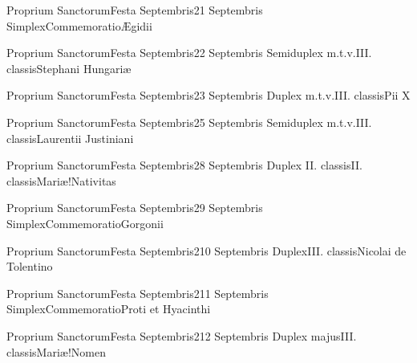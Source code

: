 \documentclass[liber-responsorialis_aestivus.tex]{subfiles}
\begin{document}

	{Proprium Sanctorum}{Festa Septembris}{2}{1 Septembris}
	{Simplex}{Commemoratio}{Ægidii}
	{}
	{}
\rubric{\respdetemp}

	{Proprium Sanctorum}{Festa Septembris}{2}{2 Septembris}
	{Semiduplex m.t.v.}{III. classis}{Stephani Hungariæ}
	{\conprubric}
	{\respdetemp}

	{Proprium Sanctorum}{Festa Septembris}{2}{3 Septembris}
	{Duplex m.t.v.}{III. classis}{Pii X}
	{\coporubric}
	{\respdetemp}

	{Proprium Sanctorum}{Festa Septembris}{2}{5 Septembris}
	{Semiduplex m.t.v.}{III. classis}{Laurentii Justiniani}
	{\coporubric}
	{\respdetemp}

	{Proprium Sanctorum}{Festa Septembris}{2}{8 Septembris}
	{Duplex II. classis}{II. classis}{Mariæ!Nativitas}
	{}
	{}
 

	{Proprium Sanctorum}{Festa Septembris}{2}{9 Septembris}
	{Simplex}{Commemoratio}{Gorgonii}
	{}
	{}
\rubric{\respdetemp}

	{Proprium Sanctorum}{Festa Septembris}{2}{10 Septembris}
	{Duplex}{III. classis}{Nicolai de Tolentino}
	{\conprubric}
	{\respdetemp}

	{Proprium Sanctorum}{Festa Septembris}{2}{11 Septembris}
	{Simplex}{Commemoratio}{Proti et Hyacinthi}
	{}
	{}
\rubric{\respdetemp}

	{Proprium Sanctorum}{Festa Septembris}{2}{12 Septembris}
	{Duplex majus}{III. classis}{Mariæ!Nomen}
	{\cbmvrubric}
	{\respdetemp}
\end{document}
